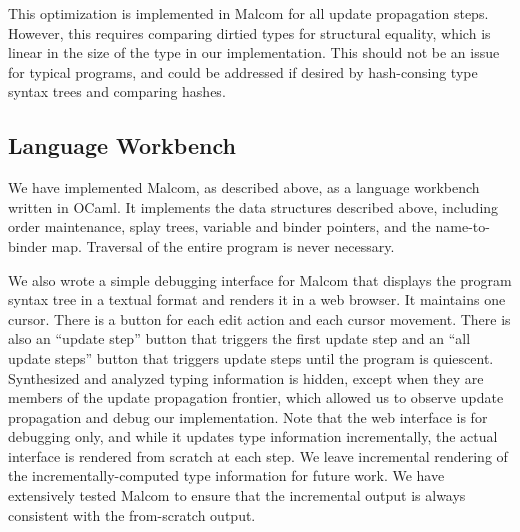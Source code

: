 This optimization is implemented in Malcom for all update propagation steps. However, this requires comparing dirtied types for structural equality, which is linear in the size of the type in our implementation. This should not be an issue for typical programs, and could be addressed if desired by hash-consing type syntax trees and comparing hashes. 

\subsection{Language Workbench}

We have implemented Malcom, as described above, as a language workbench written in OCaml. It implements the data structures described above, including order maintenance, splay trees, variable and binder pointers, and the name-to-binder map. Traversal of the entire program is never necessary.

We also wrote a simple debugging interface for Malcom that displays the program syntax tree in a textual format and renders it in a web browser. It maintains one cursor. There is a button for each edit action and each cursor movement. There is also an ``update step'' button that triggers the first update step and an ``all update steps'' button that triggers update steps until the program is quiescent. Synthesized and analyzed typing information is hidden, except when they are members of the update propagation frontier, which allowed us to observe update propagation and debug our implementation. Note that the web interface is for debugging only, and while it updates type information incrementally, the actual interface is rendered from scratch at each step. We leave incremental rendering of the incrementally-computed type information for future work. 
We have extensively tested Malcom to ensure that the incremental output is always consistent with the from-scratch output.

